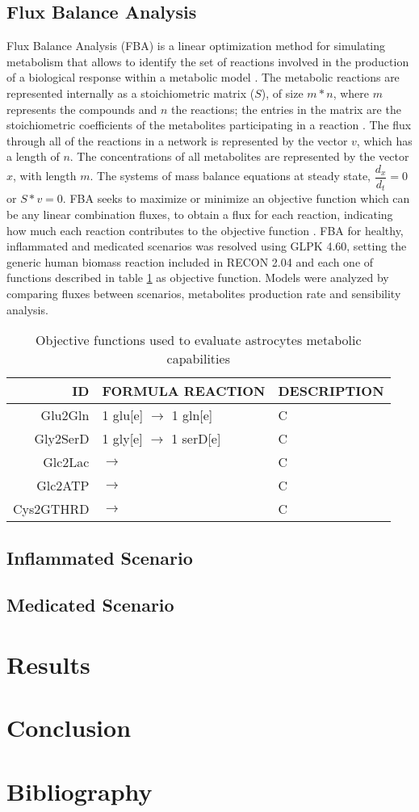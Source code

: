 \subsection{Flux Balance Analysis}
Flux Balance Analysis (FBA) is a linear optimization method for simulating metabolism that allows to identify the set of reactions involved in the production of a biological response within a metabolic model \cite{Orth2010}. The metabolic reactions are represented internally as a stoichiometric matrix ($S$), of size $m * n$, where $m$ represents the compounds and $n$ the reactions; the entries in the matrix are the stoichiometric coefficients of the metabolites participating in a reaction \cite{Raman2009}. The flux through all of the reactions in a network is represented by the vector $v$, which has a length of $n$. The concentrations of all metabolites are represented by the vector $x$, with length $m$. The systems of mass balance equations at steady state, $\dfrac{d_{x}}{d_{t}}=0$ or $S * v = 0$. FBA seeks to maximize or minimize an objective function which can be any linear combination fluxes, to obtain a flux for each reaction, indicating how much each reaction contributes to the objective function \cite{Orth2010}. FBA for healthy, inflammated and medicated scenarios was resolved using GLPK 4.60, setting the generic human biomass reaction included in RECON 2.04 and each one of functions described in table \ref{OF} as objective function. Models were analyzed by comparing fluxes between scenarios, metabolites production rate and sensibility analysis.

\begin{table}[h]
\caption{Objective functions used to evaluate astrocytes metabolic capabilities}
\label{OF}
\begin{center}
\begin{tabular}{rll}
\hline
ID & FORMULA REACTION & DESCRIPTION \\
\hline
\hline
Glu2Gln& 1 glu[e] $\rightarrow$ 1 gln[e] & C \\
Gly2SerD& 1 gly[e] $\rightarrow$ 1 serD[e] & C \\
Glc2Lac& $\rightarrow$& C \\
Glc2ATP& $\rightarrow$& C \\
Cys2GTHRD& $\rightarrow$& C \\
\hline
\end{tabular}
\end{center}
\end{table} 
\subsection{Inflammated Scenario}
\subsection{Medicated Scenario}
\section{Results}
\section{Conclusion}
\section{Bibliography}

